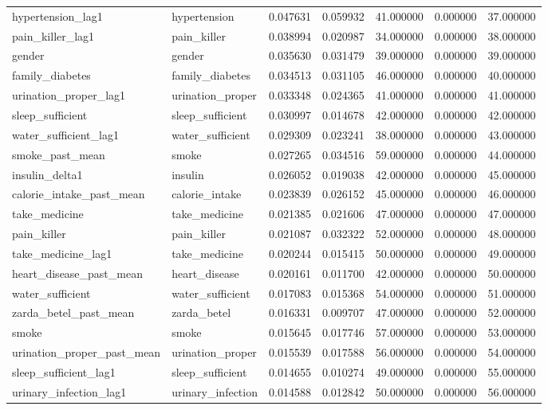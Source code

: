 \begin{longtable}{llrrrrr}
hypertension\_lag1 & hypertension & 0.047631 & 0.059932 & 41.000000 & 0.000000 & 37.000000 \\
pain\_killer\_lag1 & pain\_killer & 0.038994 & 0.020987 & 34.000000 & 0.000000 & 38.000000 \\
gender & gender & 0.035630 & 0.031479 & 39.000000 & 0.000000 & 39.000000 \\
family\_diabetes & family\_diabetes & 0.034513 & 0.031105 & 46.000000 & 0.000000 & 40.000000 \\
urination\_proper\_lag1 & urination\_proper & 0.033348 & 0.024365 & 41.000000 & 0.000000 & 41.000000 \\
sleep\_sufficient & sleep\_sufficient & 0.030997 & 0.014678 & 42.000000 & 0.000000 & 42.000000 \\
water\_sufficient\_lag1 & water\_sufficient & 0.029309 & 0.023241 & 38.000000 & 0.000000 & 43.000000 \\
smoke\_past\_mean & smoke & 0.027265 & 0.034516 & 59.000000 & 0.000000 & 44.000000 \\
insulin\_delta1 & insulin & 0.026052 & 0.019038 & 42.000000 & 0.000000 & 45.000000 \\
calorie\_intake\_past\_mean & calorie\_intake & 0.023839 & 0.026152 & 45.000000 & 0.000000 & 46.000000 \\
take\_medicine & take\_medicine & 0.021385 & 0.021606 & 47.000000 & 0.000000 & 47.000000 \\
pain\_killer & pain\_killer & 0.021087 & 0.032322 & 52.000000 & 0.000000 & 48.000000 \\
take\_medicine\_lag1 & take\_medicine & 0.020244 & 0.015415 & 50.000000 & 0.000000 & 49.000000 \\
heart\_disease\_past\_mean & heart\_disease & 0.020161 & 0.011700 & 42.000000 & 0.000000 & 50.000000 \\
water\_sufficient & water\_sufficient & 0.017083 & 0.015368 & 54.000000 & 0.000000 & 51.000000 \\
zarda\_betel\_past\_mean & zarda\_betel & 0.016331 & 0.009707 & 47.000000 & 0.000000 & 52.000000 \\
smoke & smoke & 0.015645 & 0.017746 & 57.000000 & 0.000000 & 53.000000 \\
urination\_proper\_past\_mean & urination\_proper & 0.015539 & 0.017588 & 56.000000 & 0.000000 & 54.000000 \\
sleep\_sufficient\_lag1 & sleep\_sufficient & 0.014655 & 0.010274 & 49.000000 & 0.000000 & 55.000000 \\
urinary\_infection\_lag1 & urinary\_infection & 0.014588 & 0.012842 & 50.000000 & 0.000000 & 56.000000 \\

\end{longtable}
